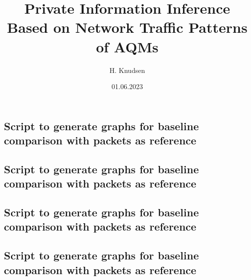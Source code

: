 \documentclass[british,titlepage]{ntnuthesis}
\title{Private Information Inference Based on Network Traffic Patterns of AQMs}
\author{H. Knudsen}
\date{01.06.2023}
\begin{document}





\tableofcontents
\listoffigures
\listoftables

\printglossary[type=\acronymtype] 










\chapter*{\bibname}
\printbibliography[heading=none]

\appendix
\renewcommand{\thesection}{\Alph{section}}
\appendixpage
\section{Script to generate graphs for baseline comparison with packets as reference}
    
    \label{app:GraphsByBytes}
\newpage
\section{Script to generate graphs for baseline comparison with packets as reference}
    
    \label{app:GraphsByPackets}
\newpage
\section{Script to generate graphs for baseline comparison with packets as reference}
    
    \label{app:GraphsByBytes_BaselineEvents}
\newpage
\section{Script to generate graphs for baseline comparison with packets as reference}
    
    \label{app:GraphsByPackets_BaselineEvents}
\end{document}
